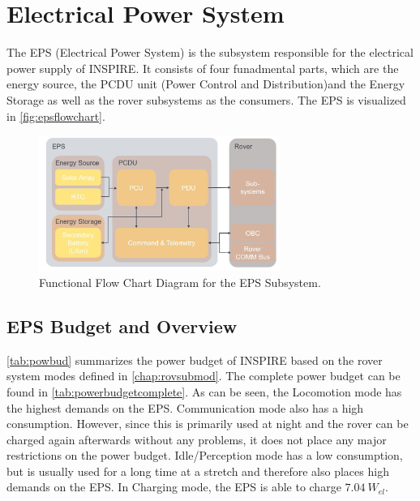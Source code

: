 \clearpage
\section{Electrical Power System}
\label{sec:EPS}
The EPS (Electrical Power System) is the subsystem responsible for the electrical power supply of INSPIRE. It consists of four funadmental parts, which are the energy source, the PCDU unit (Power Control and Distribution)and the Energy Storage as well as the rover subsystems as the consumers. The EPS is visualized in \autoref{fig:epsflowchart}.

\begin{figure}[htb]
{\centering
\includegraphics[width=0.7\textwidth]{Media/epsflowchart}
\caption{Functional Flow Chart Diagram for the EPS Subsystem.}
\label{fig:epsflowchart}
}
\end{figure}


\subsection{EPS Budget and Overview}
\autoref{tab:powbud} summarizes the power budget of INSPIRE based on the rover system modes defined in \autoref{chap:rovsubmod}. The complete power budget can be found in \autoref{tab:powerbudgetcomplete}.
As can be seen, the Locomotion mode has the highest demands on the EPS. Communication mode also has a high consumption. However, since this is primarily used at night and the rover can be charged again afterwards without any problems, it does not place any major restrictions on the power budget. Idle/Perception mode has a low consumption, but is usually used for a long time at a stretch and therefore also places high demands on the EPS. In Charging mode, the EPS is able to charge $7.04 \ W_{el} $.


